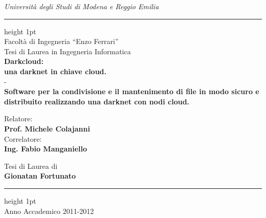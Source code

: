 \makeatletter
\def\thickhrulefill{\leavevmode \leaders \hrule height 1pt\hfill \kern \z@}
\renewcommand{\maketitle}{\begin{titlepage}%
\thispagestyle{empty}
\begin{centering}
\Large
\textit{Universit\`a degli Studi di Modena e Reggio Emilia} \\
\vspace{0.2cm}
\thickhrulefill\\
\vspace{0.2cm}
Facolt\`a di Ingegneria ``Enzo Ferrari'' \\
Tesi di Laurea in
Ingegneria Informatica\\
\vspace{4cm}
{\huge\textbf{Darkcloud:\\
una darknet in chiave cloud.}\\
-\\}
\textbf{Software per la condivisione e il mantenimento di file 
in modo sicuro e distribuito realizzando una darknet con nodi cloud.}
\vspace{6cm}

\large
\begin{minipage}{.5\textwidth}
\begin{flushleft}
Relatore:\\
\textbf{Prof. Michele Colajanni}\\
\vspace{7mm}
Correlatore:\\
\textbf{Ing. Fabio Manganiello}\\
\end{flushleft}
\end{minipage}
\begin{minipage}{.5\textwidth}
\begin{flushright}
Tesi di Laurea di\\
\textbf{Gionatan Fortunato}\\
\end{flushright}
\end{minipage}
\end{centering}
\begin{center}
\vspace{1cm}
\thickhrulefill\\
Anno Accademico 2011-2012
\end{center}
\clearpage
\thispagestyle{empty}
\clearpage
\end{titlepage}%
}

\maketitle

